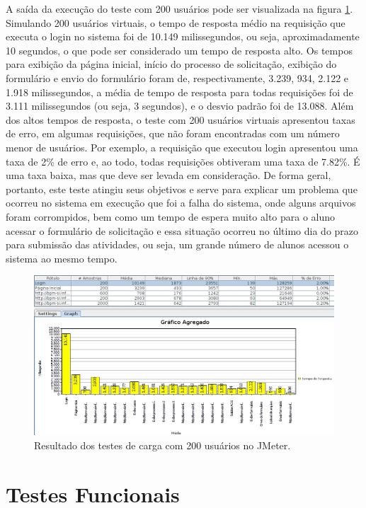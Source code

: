 \documentclass[12pt]{article}
\begin{document}
A saída da execução do teste com 200 usuários pode ser visualizada na figura \ref{fig:carga200}. Simulando 200 usuários virtuais, o tempo de resposta médio na requisição que executa o login no sistema foi de 10.149 milissegundos, ou seja, aproximadamente 10 segundos, o que pode ser considerado um tempo de resposta alto. Os tempos para exibição da página inicial, início do processo de solicitação, exibição do formulário e envio do formulário foram de, respectivamente, 3.239, 934, 2.122 e 1.918 milissegundos, a média de tempo de resposta para todas requisições foi de 3.111 milissegundos (ou seja, 3 segundos), e o desvio padrão foi de 13.088. Além dos altos tempos de resposta, o teste com 200 usuários virtuais apresentou taxas de erro, em algumas requisições, que não foram encontradas com um número menor de usuários. Por exemplo, a requisição que executou login apresentou uma taxa de 2\% de erro e, ao todo, todas requisições obtiveram uma taxa de 7.82\%. É uma taxa baixa, mas que deve ser levada em consideração. De forma geral, portanto, este teste atingiu seus objetivos e serve para explicar um problema que ocorreu no sistema em execução que foi a falha do sistema, onde alguns arquivos foram corrompidos, bem como um tempo de espera muito alto para o aluno acessar o formulário de solicitação e essa situação ocorreu no último dia do prazo para submissão das atividades, ou seja, um grande número de alunos acessou o sistema ao mesmo tempo.

\begin{figure}[ht]
\centering
\includegraphics[width=.99\textwidth]{imagens/grafico200.jpg}
\caption{Resultado dos testes de carga com 200 usuários no JMeter.}
\label{fig:carga200}
\end{figure}



\section{Testes Funcionais}
\end{document}

